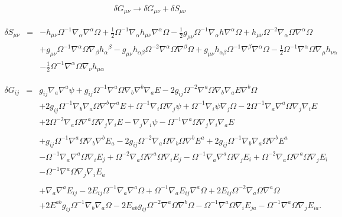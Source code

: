 \documentclass[10pt,letterpaper]{article}
\numberwithin{equation}{section}
\begin{document}
\begin{appendices}
\begin{eqnarray}
\delta G_{\mu\nu} \to \delta G_{\mu\nu} + \delta S_{\mu\nu}
\end{eqnarray}

\begin{eqnarray}
\delta S_{\mu\nu} &=& - h_{\mu \nu} \Omega^{-1} \nabla_{\alpha}\nabla^{\alpha}\Omega + \tfrac{1}{2} \Omega^{-1} \nabla_{\alpha}h_{\mu \nu} \nabla^{\alpha}\Omega -  \tfrac{1}{2} g_{\mu \nu} \Omega^{-1} \nabla_{\alpha}h \nabla^{\alpha}\Omega + h_{\mu \nu} \Omega^{-2} \nabla_{\alpha}\Omega \nabla^{\alpha}\Omega
\nonumber\\
&& + g_{\mu \nu} \Omega^{-1} \nabla^{\alpha}\Omega \nabla_{\beta}h_{\alpha}{}^{\beta} -  g_{\mu \nu} h_{\alpha \beta} \Omega^{-2} \nabla^{\alpha}\Omega \nabla^{\beta}\Omega + g_{\mu \nu} h_{\alpha \beta} \Omega^{-1} \nabla^{\beta}\nabla^{\alpha}\Omega -  \tfrac{1}{2} \Omega^{-1} \nabla^{\alpha}\Omega \nabla_{\mu}h_{\nu \alpha} 
\nonumber\\
&&-  \tfrac{1}{2} \Omega^{-1} \nabla^{\alpha}\Omega \nabla_{\nu}h_{\mu \alpha}
\end{eqnarray}

\begin{eqnarray}
\delta G_{ij}&=&g_{ij} \nabla_{a}\nabla^{a}\psi
 + g_{ij} \Omega^{-1} \nabla^{a}\Omega \nabla_{b}\nabla^{b}\nabla_{a}E
 - 2 g_{ij} \Omega^{-2} \nabla^{a}\Omega \nabla_{b}\nabla_{a}E \nabla^{b}\Omega
\nonumber\\
&& + 2 g_{ij} \Omega^{-1} \nabla_{b}\nabla_{a}\Omega \nabla^{b}\nabla^{a}E
 + \Omega^{-1} \nabla_{i}\Omega \nabla_{j}\psi
 + \Omega^{-1} \nabla_{i}\psi \nabla_{j}\Omega
 - 2 \Omega^{-1} \nabla_{a}\nabla^{a}\Omega \nabla_{j}\nabla_{i}E
\nonumber\\
&& + 2 \Omega^{-2} \nabla_{a}\Omega \nabla^{a}\Omega \nabla_{j}\nabla_{i}E
 -  \nabla_{j}\nabla_{i}\psi
 -  \Omega^{-1} \nabla^{a}\Omega \nabla_{j}\nabla_{i}\nabla_{a}E
\nonumber\\ \nonumber\\
&&+g_{ij} \Omega^{-1} \nabla^{a}\Omega \nabla_{b}\nabla^{b}E_{a}
 - 2 g_{ij} \Omega^{-2} \nabla_{a}\Omega \nabla_{b}\Omega \nabla^{b}E^{a}
 + 2 g_{ij} \Omega^{-1} \nabla_{b}\nabla_{a}\Omega \nabla^{b}E^{a}\nonumber\\
&& -  \Omega^{-1} \nabla_{a}\nabla^{a}\Omega \nabla_{i}E_{j}
 + \Omega^{-2} \nabla_{a}\Omega \nabla^{a}\Omega \nabla_{i}E_{j}
 -  \Omega^{-1} \nabla_{a}\nabla^{a}\Omega \nabla_{j}E_{i}
 + \Omega^{-2} \nabla_{a}\Omega \nabla^{a}\Omega \nabla_{j}E_{i}\nonumber\\
&& -  \Omega^{-1} \nabla^{a}\Omega \nabla_{j}\nabla_{i}E_{a}
\nonumber\\ \nonumber\\
&&+\nabla_{a}\nabla^{a}E_{ij}
 - 2 E_{ij} \Omega^{-1} \nabla_{a}\nabla^{a}\Omega
 + \Omega^{-1} \nabla_{a}E_{ij} \nabla^{a}\Omega
 + 2 E_{ij} \Omega^{-2} \nabla_{a}\Omega \nabla^{a}\Omega\nonumber\\
&& + 2 E^{ab} g_{ij} \Omega^{-1} \nabla_{b}\nabla_{a}\Omega
 - 2 E_{ab} g_{ij} \Omega^{-2} \nabla^{a}\Omega \nabla^{b}\Omega
 -  \Omega^{-1} \nabla^{a}\Omega \nabla_{i}E_{ja}
 -  \Omega^{-1} \nabla^{a}\Omega \nabla_{j}E_{ia}.
\end{eqnarray}


\end{appendices}
\end{document}
